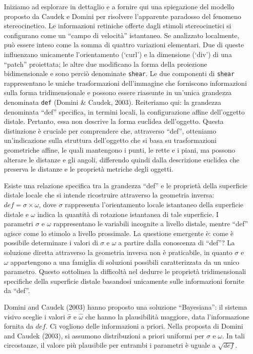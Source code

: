 \documentclass[
  man]{apa6}
\begin{document}
Iniziamo ad esplorare in dettaglio e a fornire qui una spiegazione del modello proposto da Caudek e Domini per risolvere l'apparente paradosso del fenomeno stereocinetico. Le informazioni retiniche offerte dagli stimoli stereocinetici si configurano come un ``campo di velocità'' istantaneo. Se analizzato localmente, può essere inteso come la somma di quattro variazioni elementari. Due di queste influenzano unicamente l'orientamento (`curl') e la dimensione (`div') di una ``patch'' proiettata; le altre due modificano la forma della proiezione bidimensionale e sono perciò denominate \texttt{shear}. Le due componenti di \texttt{shear} rappresentano le uniche trasformazioni dell'immagine che forniscono informazioni sulla forma tridimensionale e possono essere riassunte in un'unica grandezza denominata \texttt{def} (Domini \& Caudek, 2003). Reiteriamo qui: la grandezza denominata ``def'' specifica, in termini locali, la configurazione affine dell'oggetto distale. Pertanto, essa non descrive la forma euclidea dell'oggetto. Questa distinzione è cruciale per comprendere che, attraverso ``def'', otteniamo un'indicazione sulla struttura dell'oggetto che si basa su trasformazioni geometriche affine, le quali mantengono i punti, le rette e i piani, ma possono alterare le distanze e gli angoli, differendo quindi dalla descrizione euclidea che preserva le distanze e le proprietà metriche degli oggetti.

Esiste una relazione specifica tra la grandezza ``def'' e le proprietà della superficie distale locale che si intende ricostruire attraverso la geometria inversa: \(def = \sigma \times \omega\), dove \(\sigma\) rappresenta l'orientamento locale istantaneo della superficie distale e \(\omega\) indica la quantità di rotazione istantanea di tale superficie. I parametri \(\sigma\) e \(\omega\) rappresentano le variabili incognite a livello distale, mentre ``def'' agisce come lo stimolo a livello prossimale. La questione emergente è: come è possibile determinare i valori di \(\sigma\) e \(\omega\) a partire dalla conoscenza di ``def''? La soluzione diretta attraverso la geometria inversa non è praticabile, in quanto \(\sigma\) e \(\omega\) appartengono a una famiglia di soluzioni possibili caratterizzata da un unico parametro. Questo sottolinea la difficoltà nel dedurre le proprietà tridimensionali specifiche della superficie distale basandosi unicamente sulle informazioni fornite da ``def''.

Domini and Caudek (2003) hanno proposto una soluzione ``Bayesiana'': il sistema visivo sceglie i valori \(\hat{\sigma}\) e \(\hat{\omega}\) che hanno la plausibilità maggiore, data l'informazione fornita da \(def\). Ci vogliono delle informazioni a priori. Nella proposta di Domini and Caudek (2003), si assumono distribuzioni a priori uniformi per \(\sigma\) e \(\omega\). In tali circostanze, il valore più plausibile per entrambi i parametri è uguale a \(\sqrt{def}\).
\end{document}
